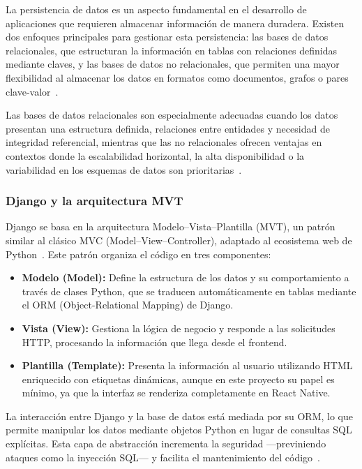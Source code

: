 La persistencia de datos es un aspecto fundamental en el desarrollo de aplicaciones que requieren almacenar información de manera duradera. Existen dos enfoques principales para gestionar esta persistencia: las bases de datos relacionales, que estructuran la información en tablas con relaciones definidas mediante claves, y las bases de datos no relacionales, que permiten una mayor flexibilidad al almacenar los datos en formatos como documentos, grafos o pares clave-valor~\cite{elmasri2017}. 

Las bases de datos relacionales son especialmente adecuadas cuando los datos presentan una estructura definida, relaciones entre entidades y necesidad de integridad referencial, mientras que las no relacionales ofrecen ventajas en contextos donde la escalabilidad horizontal, la alta disponibilidad o la variabilidad en los esquemas de datos son prioritarias~\cite{stonebraker2011}.

\subsubsection{Django y la arquitectura MVT}

Django se basa en la arquitectura Modelo–Vista–Plantilla (MVT), un patrón similar al clásico MVC (Model–View–Controller), adaptado al ecosistema web de Python~\cite{vincent2020}. Este patrón organiza el código en tres componentes:

\begin{itemize}
    \item \textbf{Modelo (Model):} Define la estructura de los datos y su comportamiento a través de clases Python, que se traducen automáticamente en tablas mediante el ORM (Object-Relational Mapping) de Django.
    \item \textbf{Vista (View):} Gestiona la lógica de negocio y responde a las solicitudes HTTP, procesando la información que llega desde el frontend.
    \item \textbf{Plantilla (Template):} Presenta la información al usuario utilizando HTML enriquecido con etiquetas dinámicas, aunque en este proyecto su papel es mínimo, ya que la interfaz se renderiza completamente en React Native.
\end{itemize}

La interacción entre Django y la base de datos está mediada por su ORM, lo que permite manipular los datos mediante objetos Python en lugar de consultas SQL explícitas. Esta capa de abstracción incrementa la seguridad —previniendo ataques como la inyección SQL— y facilita el mantenimiento del código~\cite{vincent2020}.

